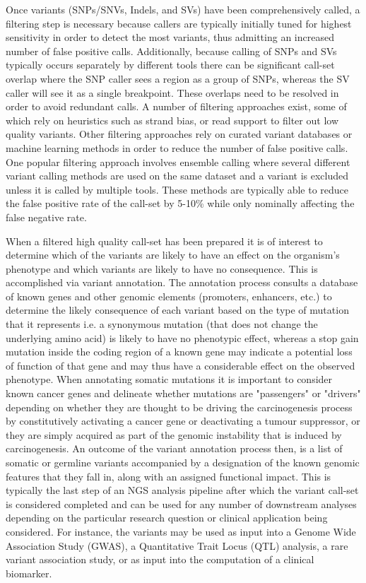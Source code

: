 Once variants (SNPs/SNVs, Indels, and SVs) have been comprehensively called, a filtering step is necessary because callers are typically initially tuned for highest sensitivity in order to detect the most variants, thus admitting an increased number of false positive calls. Additionally, because calling of SNPs and SVs typically occurs separately by different tools there can be significant call-set overlap where the SNP caller sees a region as a group of SNPs, whereas the SV caller will see it as a single breakpoint. These overlaps need to be resolved in order to avoid redundant calls. A number of filtering approaches exist, some of which rely on heuristics such as strand bias, or read support to filter out low quality variants. Other filtering approaches rely on curated variant databases or machine learning methods in order to reduce the number of false positive calls. One popular filtering approach involves ensemble calling where several different variant calling methods are used on the same dataset and a variant is excluded unless it is called by multiple tools. These methods are typically able to reduce the false positive rate of the call-set by 5-10\% while only nominally affecting the false negative rate\autocite{van2013fastq}.

When a filtered high quality call-set has been prepared it is of interest to determine which of the variants are likely to have an effect on the organism's phenotype and which variants are likely to have no consequence. This is accomplished via variant annotation\autocite{mclaren2016ensembl}. The annotation process consults a database of known genes and other genomic elements (promoters, enhancers, etc.) to determine the likely consequence of each variant based on the type of mutation that it represents i.e. a synonymous mutation (that does not change the underlying amino acid) is likely to have no phenotypic effect, whereas a stop gain mutation inside the coding region of a known gene may indicate a potential loss of function of that gene and may thus have a considerable effect on the observed phenotype. When annotating somatic mutations it is important to consider known cancer genes and delineate whether mutations are "passengers" or "drivers" depending on whether they are thought to be driving the carcinogenesis process by constitutively activating a cancer gene or deactivating a tumour suppressor, or they are simply acquired as part of the genomic instability that is induced by carcinogenesis. An outcome of the variant annotation process then, is a list of somatic or germline variants accompanied by a designation of the known genomic features that they fall in, along with an assigned functional impact. This is typically the last step of an NGS analysis pipeline after which the variant call-set is considered completed and can be used for any number of downstream analyses depending on the particular research question or clinical application being considered. For instance, the variants may be used as input into a Genome Wide Association Study (GWAS)\autocite{visscher2012five}, a Quantitative Trait Locus (QTL) analysis\autocite{zeng1994precision}, a rare variant association study\autocite{lee2014rare}, or as input into the computation of a clinical biomarker\autocite{simon2013implementing}. 

